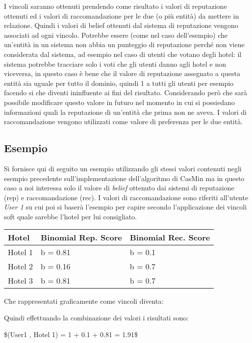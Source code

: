 \documentclass{report}
\begin{document}
	I vincoli saranno ottenuti prendendo come risultato i valori di
	reputazione ottenuti ed i valori di raccomandazione per le due (o più
	entità) da mettere in relazione. Quindi i valori di belief ottenuti dal
	sistema di reputazione vengono associati ad ogni vincolo. Potrebbe
	essere (come nel caso dell'esempio) che un'entità in un sistema non
	abbia un punteggio di reputazione perché non viene considerata dal
	sistema, ad esempio nel caso di utenti che votano degli hotel: il
	sistema potrebbe tracciare solo i voti che gli utenti danno agli hotel e
	non viceversa, in questo caso è bene che il valore di reputazione
	assegnato a questa entità sia uguale per tutto il dominio, quindi 1 a
	tutti gli utenti per esempio facendo si che diventi ininfluente ai fini
	del risultato. Considerando però che sarà possibile modificare questo
	valore in futuro nel momento in cui si possiedano informazioni quali la
	reputazione di un'entità che prima non ne aveva. I valori di
	raccomandazione vengono utilizzati come valore di preferenza per le due
	entità.
	
	\hypertarget{header-n241}{%
		\subsection{Esempio}\label{header-n241}}
	
	Si fornisce qui di seguito un esempio utilizzando gli stessi valori
	contenuti negli esempio precedente sull'implementazione dell'algoritmo
	di CasMin ma in questo caso a noi interessa solo il valore di
	\emph{belief} ottenuto dai sistemi di reputazione (rep) e
	raccomandazione (rec). I valori di raccomandazione sono riferiti
	all'utente \emph{User 1} su cui poi si baserà l'esempio per capire
	secondo l'applicazione dei vincoli soft quale sarebbe l'hotel per lui
	consigliato.
	
	\begin{longtable}[]{@{}lll@{}}
		\toprule
		Hotel & Binomial Rep. Score & Binomial Rec. Score\tabularnewline
		\midrule
		\endhead
		Hotel 1 & b = 0.81 & b = 0.1\tabularnewline
		Hotel 2 & b = 0.16 & b = 0.7\tabularnewline
		Hotel 3 & b = 0.81 & b = 0.7\tabularnewline
		\bottomrule
	\end{longtable}
	
	Che rappresentati graficamente come vincoli diventa:
	
	
	Quindi effettuando la combinazione dei valori i risultati sono:
	
	\$(User1 , Hotel 1) = 1 + 0.1 + 0.81 = 1.91\$
	
\end{document}
